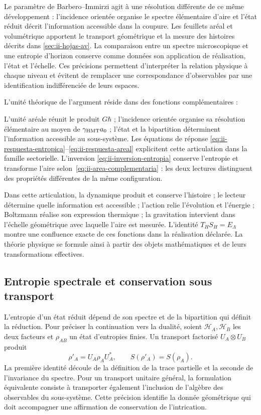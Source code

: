 Le paramètre de Barbero--Immirzi agit à une résolution différente
de ce même développement : l’incidence orientée organise le spectre
élémentaire d’aire et l’état réduit décrit l’information
accessible dans la coupure. Les feuillets aréal et volumétrique apportent le
transport géométrique et la mesure des histoires décrits dans
\cref{sec:ii-hojas-av}. La comparaison entre un spectre microscopique
et une entropie d’horizon conserve comme données son application de réalisation,
l’état et l’échelle. Ces précisions permettent d’interpréter la
relation physique à chaque niveau et évitent de remplacer une correspondance
d’observables par une identification indifférenciée de leurs espaces.

L’unité théorique de l’argument réside dans des fonctions complémentaires :

L’unité aréale réunit le produit $G\hbar$ ; l’incidence orientée
organise sa résolution élémentaire au moyen de $\gamma_{\mathrm{HMT}}a_0$ ;
l’état et la bipartition déterminent l’information accessible au
sous-système. Les équations de réponse
\eqref{eq:ii-respuesta-entropica}--\eqref{eq:ii-respuesta-areal}
explicitent cette articulation dans la famille sectorielle. L’inversion
\eqref{eq:ii-inversion-entropia} conserve l’entropie et transforme
l’aire selon~\eqref{eq:ii-area-complementaria} : les deux lectures
distinguent des propriétés différentes de la même configuration.

Dans cette articulation,
la dynamique produit et conserve l’histoire ; le lecteur détermine quelle
information est accessible ; l’action relie l’évolution et l’énergie ;
Boltzmann réalise son expression thermique ; la gravitation intervient
dans l’échelle géométrique avec laquelle l’aire est mesurée. L’identité
\(T_HS_H=E_\Lambda\) montre une confluence exacte de ces fonctions
dans la réalisation déclarée. La théorie physique se formule ainsi à partir
des objets mathématiques et de leurs transformations effectives.

\subsection{Entropie spectrale et conservation sous transport}

L’entropie d’un état réduit dépend de son spectre et de la
bipartition qui définit la réduction. Pour préciser la continuation
vers la dualité, soient \(\mathcal H_A,\mathcal H_B\) les deux facteurs
et \(\rho_{AB}\) un état d’entropies finies. Un transport
factorisé \(U_A\otimes U_B\) produit
\[
 \rho'_A=U_A\rho_AU_A^*,\qquad S(\rho'_A)=S(\rho_A).
\]
La première identité découle de la définition de la trace partielle et la
seconde de l’invariance du spectre. Pour un transport unitaire
général, la formulation équivalente consiste à transporter également
l’inclusion de l’algèbre des observables du sous-système. Cette précision
identifie la donnée géométrique qui doit accompagner une affirmation
de conservation de l’intrication.

